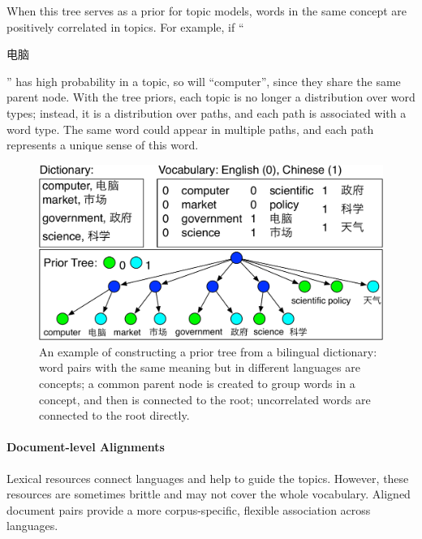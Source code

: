 
When this tree serves as a prior for topic models, words in the same concept are positively correlated in topics.
For example, if ``\begin{CJK*}{UTF8}{gbsn}电脑\end{CJK*}'' has high probability in a topic, so will ``computer'', since they share the same parent node. With the tree priors, each topic is no longer a distribution over word types; instead, it is a distribution over paths, and each path is
associated with a word type.  The same word could appear in multiple paths, and each path represents a unique sense of this word.

\begin{figure}
\centering
\includegraphics[width=0.9\linewidth]{figures/correlations_tree-crop.pdf}
\vspace{-3mm}
\caption[Constructing prior tree from a bilingual dictionary]{An example of constructing a prior tree from a
  bilingual dictionary: word pairs with the same meaning but in
  different languages are concepts; a common parent node is created to
  group words in a concept, and then is connected to the root;
  uncorrelated words are connected to the root directly.}
\label{fig:prior_trees}
\end{figure}


\paragraph{\bf Document-level Alignments}

Lexical resources connect languages and help to guide the topics. However, these resources are sometimes brittle and may not cover the whole vocabulary. Aligned document pairs provide a more corpus-specific, flexible association across languages.

